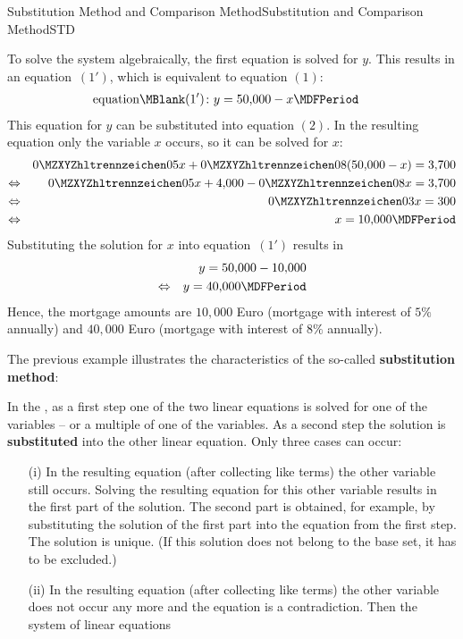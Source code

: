 \begin{MXContent}{Substitution Method and Comparison Method}{Substitution and Comparison Method}{STD}
\begin{MExample}
To solve the system algebraically, the first equation is solved for $y$. This results in an  
equation~$(1')$, which is equivalent to equation $(1)$:
\begin{eqnarray*}
\mbox{equation}\MBlank (1') & \colon y = 50{,}000 - x\MDFPeriod 
\end{eqnarray*}
This equation for $y$ can be substituted into equation $(2)$. In the resulting 
equation only the variable  
$x$ occurs, so it can be solved for $x$:
\begin{eqnarray*}
& & \MZahl{0}{05} x + \MZahl{0}{08} (50{,}000 - x) = 3{,}700 \\
\Leftrightarrow & & \MZahl{0}{05} x + 4{,}000 - \MZahl{0}{08} x = 3{,}700 \\
\Leftrightarrow & & \MZahl{0}{03} x = 300 \\
\Leftrightarrow & & x = 10{,}000\MDFPeriod 
\end{eqnarray*}
Substituting the solution for $x$ into equation~$(1')$ results in
\begin{eqnarray*}
& & y = 50{,}000 - 10{,}000 \\
\Leftrightarrow & & y = 40{,}000\MDFPeriod 
\end{eqnarray*}
Hence, the mortgage amounts are $10{,}000$ Euro (mortgage with interest of $5\%$ annually) and
$40{,}000$ Euro (mortgage with interest of $8\%$ annually).
\end{MExample}
The previous example illustrates the characteristics of the so-called 
\textbf{substitution method}:
\begin{MInfo}
In the , as a first step 
one of the two linear equations is solved for one of the variables -- or a multiple 
of one of the variables. As a second step the solution is 
\textbf{substituted} into the other linear equation. Only three cases can occur:
\begin{itemize}
\item[(i)]{In the resulting equation (after collecting like terms) the other variable
still occurs. Solving the resulting equation for this other variable results in the first
part of the solution. The second part is obtained, for example, by substituting the solution
of the first part into the equation from the first step. The solution is unique. (If this
solution does not belong to the base set, it has to be excluded.)}
\item[(ii)]{In the resulting equation (after collecting like terms) the other variable
does not occur any more and the equation is a contradiction. Then the system of linear equations
}
\end{itemize}
\end{MInfo}
\end{MXContent}
